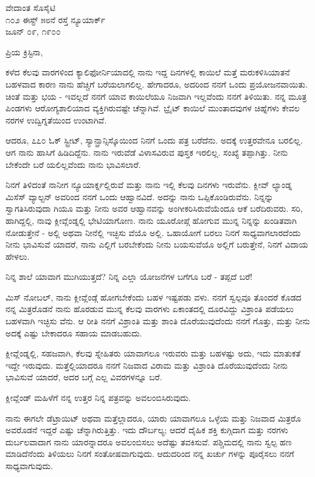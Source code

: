 \begin{flushright}
ವೇದಾಂತ ಸೊಸೈಟಿ\\೧೦೨ ಈಸ್ಟ್ ೫೮ನೆ ರಸ್ತೆ ನ್ಯೂಯಾರ್ಕ್\\ಜೂನ್ ೦೯, ೧೯೦೦
\end{flushright}

ಪ್ರಿಯ ಕ್ರಿಸ್ಟಿನಾ,

ಕಳೆದ ಕೆಲವು ವಾರಗಳಿಂದ ಕ್ಯಾಲಿಫೋರ್ನಿಯಾದಲ್ಲಿ ನಾನು ಇದ್ದ ದಿನಗಳಲ್ಲಿ ಕಾಯಿಲೆ ಮತ್ತೆ ಮರುಕಳಿಸಿಯಾತನೆ ಬಹಳವಾದ ಕಾರಣ ನಾನು ಹೆಚ್ಚಿಗೆ ಬರೆಯಲಾಗಲಿಲ್ಲ. ಹೇಗಾದರೂ, ಅದರಿಂದ ನನಗೆ ಒಂದು ಪ್ರಯೋಜನವಾಯಿತು. ಚಿಂತೆ ಮತ್ತು ಭಯ - ಇವಲ್ಲದೆ ನನಗೆ ಯಾವ ಕಾಯಿಲೆಯೂ ನಿಜವಾಗಿ ಇಲ್ಲವೆಂದು ನನಗೆ ತಿಳಿಯಿತು. ನನ್ನ ಮೂತ್ರ ಪಿಂಡಗಳು ಆರೋಗ್ಯಶಾಲಿಯಾದ ವ್ಯಕ್ತಿಗಿರುವಷ್ಟೇ ಚೆನ್ನಾಗಿವೆ. ಬ್ರೈಟ್ ಕಾಯಿಲೆ ಮುಂತಾದವುಗಳ ಚಿಹ್ನೆಗಳು ಕೇವಲ ನರಗಳ ಉದ್ವಿಗ್ನತೆಯಿಂದ ಉಂಟಾಗಿವೆ.

ಆದರೂ, ೭೭೦ ಓಕ್ ಸ್ಟ್ರೀಟ್, ಸ್ಯಾನ್ಫ್ರಾನ್ಸಿಸ್ಕೊಯಿಂದ ನಿನಗೆ ಒಂದು ಪತ್ರ ಬರೆದೆನು. ಅದಕ್ಕೆ ಉತ್ತರವೇನೂ ಬರಲಿಲ್ಲ. ಆಗ ನಾನು ಹಾಸಿಗೆ ಹಿಡಿದಿದ್ದೆನು. ನಾನು ಇರುವೆಡೆ ವಿಳಾಸವಿರುವ ಪುಸ್ತಕ ಇರಲಿಲ್ಲ. ಸಂಖ್ಯೆ ತಪ್ಪಾಗಿತ್ತು. ನೀನು ಬೇಕೆಂದೇ ಬರೆ ಯಲಿಲ್ಲವೆಂದು ನಾನು ಭಾವಿಸಲಾರೆ.

ನಿನಗೆ ತಿಳಿದಂತೆ ನಾನೀಗ ನ್ಯೂಯಾರ್ಕ್ನಲ್ಲಿರುವೆ ಮತ್ತು ನಾನು ಇಲ್ಲಿ ಕೆಲವು ದಿನಗಳು ಇರುವೆನು. ಕ್ಲೀವ್ ಲ್ಯಾಂಡ್ನ ಮಿಸೆಸ್ ವ್ಯಾಲ್ಟನ್ ಅವರಿಂದ ನನಗೆ ಒಂದು ಆಹ್ವಾನವಿದೆ. ಅದನ್ನು ನಾನು ಒಪ್ಪಿಕೊಂಡಿರುವೆನು. ನಿನ್ನನ್ನು ಸ್ವಾಗತಿಸಿರುವುದಾ ಗಿಯೂ ಮತ್ತು ನೀನು ಅವರ ಆಹ್ವಾನವನ್ನು ಅಂಗೀಕರಿಸಿರುವೆಯೆಂದೂ ಆಕೆ ಬರೆದಿರುವರು. ಸರಿ, ಹಾಗಿದ್ದಲ್ಲಿ, ನಾವು ಕ್ಲೀವ್ಲೆಂಡ್ನಲ್ಲಿ ಭೇಟಿಯಾಗೋಣ. ನಾನು ಯೂರೋಪ್ಗೆ ಹೋಗುವ ಮುನ್ನ ನಿನ್ನನ್ನು ಖಂಡಿತವಾಗಿ ನೋಡುತ್ತೇನೆ - ಅಲ್ಲಿ ಅಥವಾ ನೀನೆಲ್ಲಿ ಇಚ್ಛಿಸು ವೆಯೊ ಅಲ್ಲಿ. ಒಹಾಯೋಗೆ ಬರಲು ನಿನಗೆ ಸಾಧ್ಯವಾಗಲಾರದೆಂದು ನೀನು ಭಾವಿಸುವೆ ಯಾದರೆ, ನಾನು ಎಲ್ಲಿಗೆ ಬರಬೇಕೆಂದು ನೀನು ಬಯಸುವೆಯೊ ಅಲ್ಲಿಗೆ ಬರುತ್ತೇನೆ, ನಿನಗೆ ವಿದಾಯ ಹೇಳಲು.

ನಿನ್ನ ಶಾಲೆ ಯಾವಾಗ ಮುಗಿಯುತ್ತದೆ? ನಿನ್ನ ಎಲ್ಲಾ ಯೋಜನೆಗಳ ಬಗೆಗೂ ಬರೆ - ತಪ್ಪದೆ ಬರೆ!

ಮಿಸ್ ನೋಬಲ್, ನಾನು ಕ್ಲೀವ್ಲೆಂಡ್ಗೆ ಹೋಗಬೇಕೆಂದು ಬಹಳ ಇಷ್ಟಪಡು ವಳು. ನನಗೆ ಸ್ವಲ್ಪವೂ ತೊಂದರೆ ಕೊಡದ ನನ್ನ ಮಿತ್ರರೊಡನೆ ನಾನು ಹೊರಡುವ ಮುನ್ನ ಕೆಲವು ವಾರಗಳು ಏಕಾಂತದಲ್ಲಿ ದೂರವಿದ್ದು ವಿಶ್ರಾಂತಿ ಪಡೆಯಲು ಬಹಳವಾಗಿ ಇಚ್ಛಿಸು ವೆನು. ಆ ರೀತಿ ನನಗೆ ವಿಶ್ರಾಂತಿ ಮತ್ತು ಶಾಂತಿ ದೊರೆಯುವುದೆಂದು ನನಗೆ ಗೊತ್ತು, ಮತ್ತು ನೀನು ಅದಕ್ಕೆ ಎಷ್ಟು ಬೇಕಾದರೂ ಸಹಾಯ ಮಾಡಬಹುದು.

ಕ್ಲೀವ್ಲೆಂಡ್ನಲ್ಲಿ, ಸಹಜವಾಗಿ, ಕೆಲವು ಸ್ನೇಹಿತರು ಯಾವಾಗಲೂ ಇರುವರು ಮತ್ತು ಬಹಳಷ್ಟು ಅದು, ಇದು ಮಾತುಕತೆ ಇದ್ದೇ ಇರುವುದು. ಮತ್ತೆಲ್ಲಿಯಾದರೂ ನನಗೆ ನಿಜವಾದ ವಿರಾಮ ಮತ್ತು ವಿಶ್ರಾಂತಿ ದೊರೆಯುವುದೆಂದು ನೀನು ಭಾವಿಸುವೆ ಯಾದರೆ, ಅದರ ಬಗ್ಗೆ ಎಲ್ಲ ವಿವರಗಳನ್ನೂ ಬರೆ.

ಕ್ಲೀವ್ಲೆಂಡ್ ಮಹಿಳೆಗೆ ನನ್ನ ಉತ್ತರ ನಿನ್ನ ಪತ್ರವನ್ನು ಅವಲಂಬಿಸಿರುವುದು.

ನಾನು ಈಗಲೇ ಡೆಟ್ರಾಯಿಟ್ ಅಥವಾ ಮತ್ತೆಲ್ಲಾದರೂ, ಯಾರು ಯಾವಾಗಲೂ ಒಳ್ಳೆಯ ಮತ್ತು ನಿಜವಾದ ಮಿತ್ರರೊ ಅವರೊಡನೆ ಇದ್ದರೆ ಎಷ್ಟು ಚೆನ್ನಾಗಿರುತ್ತಿತ್ತು. ಇದು ದೌರ್ಬಲ್ಯ; ಆದರೆ ದೈಹಿಕ ಶಕ್ತಿ ಕುಗ್ಗಿದಾಗ ಮತ್ತು ನರಗಳು ದುರ್ಬಲವಾದಾಗ ನಾನು ಯಾರನ್ನಾದರೂ ಅವಲಂಬಿಸಲು ಅದೆಷ್ಟು ತವಕಿಸುವೆ. ಪಶ್ಚಿಮದಲ್ಲಿ ನಾನು ಸ್ವಲ್ಪ ಹಣ ಮಾಡಿದೆನೆಂದು ತಿಳಿಯಲು ನಿನಗೆ ಸಂತೋಷವಾಗುವುದು. ಆದುದರಿಂದ ನನ್ನ ಖರ್ಚು ಗಳನ್ನು ಪೂರೈಸಲು ನನಗೆ ಸಾಧ್ಯವಾಗುವುದು.

